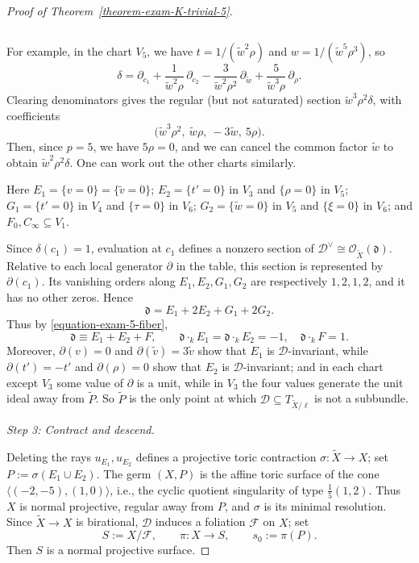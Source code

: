\documentclass[reqno,oneside]{amsart}
\theoremstyle{definition}
\theoremstyle{plain}
\numberwithin{equation}{section}
\begin{document}
\begin{proof}[Proof of Theorem~\ref{theorem-exam-K-trivial-5}]
\begin{center}
\begin{tabular}{c|c|c|cccc}
  \end{tabular}
  \end{center}
  For example, in the chart $V_5$, we have $t = 1/(\tilde{w}^2\rho)$ and $w = 1/(\tilde{w}^5\rho^3)$, so \[
    \delta=\partial_{c_1}+\frac1{\tilde w^2\rho}\,\partial_{c_2}
    -\frac3{\tilde w^2\rho^2}\,\partial_{\tilde w} +\frac5{\tilde w^3\rho}\,\partial_\rho.
  \]
  Clearing denominators gives the regular (but not saturated) section \(\tilde w^3\rho^2\delta\), with coefficients
  \[
  \bigl(\tilde w^3\rho^2,\ \tilde w\rho,\ -3\tilde w,\ 5\rho\bigr).
  \]
  Then, since $p=5$, we have $5\rho=0$, and we can cancel the common factor $\tilde{w}$ to obtain $\tilde w^2\rho^2\delta$.
  One can work out the other charts similarly.

  Here $E_1=\{v=0\}=\{\tilde v=0\}$; $E_2=\{t'=0\}$ in $V_3$ and $\{\rho=0\}$ in $V_5$; $G_1=\{t'=0\}$ in $V_4$ and $\{\tau=0\}$ in $V_6$; $G_2=\{\tilde w=0\}$ in $V_5$ and $\{\xi=0\}$ in $V_6$; and $F_0,C_\infty\subseteq V_1$.

  Since $\delta(c_1)=1$, evaluation at $c_1$ defines a nonzero section of
  $\mathcal D^\vee\cong\mathcal O_{\widetilde X}(\mathfrak d)$.  Relative to
  each local generator $\partial$ in the table, this section is represented
  by $\partial(c_1)$.  Its vanishing orders along
  $E_1,E_2,G_1,G_2$ are respectively $1,2,1,2$, and it has no other zeros.
  Hence
  \begin{equation}\label{equation-exam-5-d}
    \mathfrak d=E_1+2E_2+G_1+2G_2.
  \end{equation}
  Thus by \eqref{equation-exam-5-fiber}, \[
    \mathfrak d \equiv E_1+E_2+F,\qquad
    \mathfrak d\cdot_kE_1=\mathfrak d\cdot_kE_2=-1,\quad \mathfrak d\cdot_kF=1 .
  \]
  Moreover, $\partial(v)=0$ and $\partial(\tilde v)=3\tilde v$ show that $E_1$ is $\mathcal D$-invariant, while $\partial(t')=-t'$ and $\partial(\rho)=0$ show that $E_2$ is $\mathcal D$-invariant;
   and in each chart except $V_3$ some value of $\partial$ is a unit, while in $V_3$ the four values generate the unit ideal away from $\widetilde P$.
  So $\widetilde P$ is the only point at which $\mathcal D\subseteq T_{\widetilde X/\ell}$ is not a subbundle.

  \medskip
  \emph{Step 3: Contract and descend.}
    \medskip
    
  Deleting the rays $u_{E_1},u_{E_2}$ defines a projective toric contraction $\sigma\colon\widetilde X\to X$; set $P:=\sigma(E_1\cup E_2)$.
  The germ $(X,P)$ is the affine toric surface of the cone $\langle(-2,-5),(1,0)\rangle$, i.e., the cyclic quotient singularity of type $\frac15(1,2)$.
  Thus $X$ is normal projective, regular away from $P$, and $\sigma$ is its minimal resolution.
  Since $\widetilde X\to X$ is birational, $\mathcal D$ induces a foliation $\mathcal F$ on $X$; set
  \[
    S:=X/\mathcal F,\qquad \pi\colon X\to S,\qquad s_0:=\pi(P).
  \]
  Then $S$ is a normal projective surface.


\end{proof}
\end{document}
